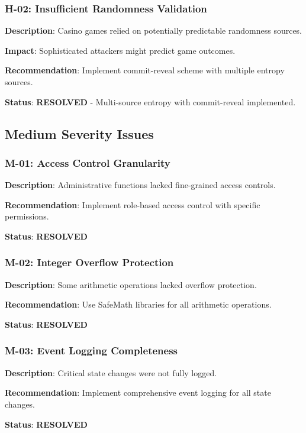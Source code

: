 \documentclass[11pt,a4paper]{article}
\begin{document}
\subsubsection{H-02: Insufficient Randomness Validation}
\textbf{Description}: Casino games relied on potentially predictable randomness sources.

\textbf{Impact}: Sophisticated attackers might predict game outcomes.

\textbf{Recommendation}: Implement commit-reveal scheme with multiple entropy sources.

\textbf{Status}: \textcolor{danzoGreen}{\textbf{RESOLVED}} - Multi-source entropy with commit-reveal implemented.

\subsection{Medium Severity Issues}

\subsubsection{M-01: Access Control Granularity}
\textbf{Description}: Administrative functions lacked fine-grained access controls.

\textbf{Recommendation}: Implement role-based access control with specific permissions.

\textbf{Status}: \textcolor{danzoGreen}{\textbf{RESOLVED}}

\subsubsection{M-02: Integer Overflow Protection}
\textbf{Description}: Some arithmetic operations lacked overflow protection.

\textbf{Recommendation}: Use SafeMath libraries for all arithmetic operations.

\textbf{Status}: \textcolor{danzoGreen}{\textbf{RESOLVED}}

\subsubsection{M-03: Event Logging Completeness}
\textbf{Description}: Critical state changes were not fully logged.

\textbf{Recommendation}: Implement comprehensive event logging for all state changes.

\textbf{Status}: \textcolor{danzoGreen}{\textbf{RESOLVED}}
\end{document}
